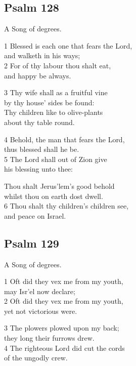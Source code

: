 \begin{multicols}{3}
\begin{center}
\quad{}\quad{}
\end{center}

\subsection*{Psalm 128}

A Song of degrees.

1 Blessed is each one that fears the Lord,\\
and walketh in his ways;\\
2 For of thy labour thou shalt eat,\\
and happy be always.

3 Thy wife shall as a fruitful vine\\
by thy house’ sides be found:\\
Thy children like to olive-plants\\
about thy table round.

4 Behold, the man that fears the Lord,\\
thus blessed shall he be.\\
5 The Lord shall out of Zion give\\
his blessing unto thee:

Thou shalt Jerus’lem’s good behold\\
whilst thou on earth dost dwell.\\
6 Thou shalt thy children’s children see,\\
and peace on Israel.

\begin{center}
\quad{}\quad{}
\end{center}

\subsection*{Psalm 129}


A Song of degrees.

1 Oft did they vex me from my youth,\\
may Isr’el now declare;\\
2 Oft did they vex me from my youth,\\
yet not victorious were.

3 The plowers plowed upon my back;\\
they long their furrows drew.\\
4 The righteous Lord did cut the cords\\
of the ungodly crew.


\end{multicols}
